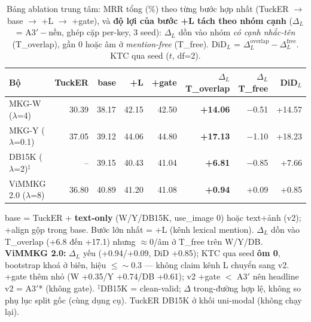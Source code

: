 \begin{table}[t]
\centering
\footnotesize
\setlength{\tabcolsep}{4pt}
\caption{Bảng ablation trung tâm: MRR tổng (\%) theo từng bước hợp nhất (TuckER $\to$ base $\to$ +L $\to$ +gate), và \textbf{độ lợi của bước +L tách theo nhóm cạnh} ($\Delta_L$ = A3$'-$nền, ghép cặp per-key, 3 seed): $\Delta_L$ dồn vào nhóm \emph{có cạnh nhắc-tên} (T\_overlap), gần 0 hoặc âm ở \emph{mention-free} (T\_free). DiD$_L$ = $\Delta_L^{\text{overlap}}-\Delta_L^{\text{free}}$. KTC qua seed ($t$, df=2).}
\label{tab:trung_tam}
\begin{tabular}{l r r r r r r r}
\toprule
Bộ & TuckER & base & +L & +gate & $\Delta_L$ T\_overlap & $\Delta_L$ T\_free & DiD$_L$ \\
\midrule
MKG-W ($\lambda$=4) & 30.39 & 38.17 & 42.15 & 42.50 & \textbf{+14.06} & $-$0.51 & +14.57 \\
MKG-Y ($\lambda$=0.1) & 37.05 & 39.12 & 44.06 & 44.80 & \textbf{+17.13} & $-$1.10 & +18.23 \\
DB15K ($\lambda$=2)$^\ddagger$ & -- & 39.15 & 40.43 & 41.04 & \textbf{+6.81} & $-$0.85 & +7.66 \\
ViMMKG 2.0 ($\lambda$=8) & 36.80 & 40.89 & 41.20 & 41.08 & \textbf{+0.94} & +0.09 & +0.85 \\
\bottomrule
\end{tabular}
\vspace{2pt}
\begin{minipage}{\linewidth}\footnotesize\raggedright
base = TuckER + \textbf{text-only} (W/Y/DB15K, use\_image 0) hoặc text+ảnh (v2); +align gộp trong base. Bước lớn nhất = +L (kênh lexical mention). $\Delta_L$ dồn vào T\_overlap (+6.8 đến +17.1) nhưng $\approx$0/âm ở T\_free trên W/Y/DB. \textbf{ViMMKG 2.0:} $\Delta_L$ yếu (+0.94/+0.09, DiD +0.85); KTC qua seed \textbf{ôm 0}, bootstrap khoá ở biên, hiệu $\le\sim$0.3 --- không claim kênh L chuyển sang v2. +gate thêm nhỏ (W +0.35/Y +0.74/DB +0.61); v2 +gate $<$ A3$'$ nên headline v2 = A3$'$* (không gate). $^\ddagger$DB15K = clean-valid; $\Delta$ trong-đường hợp lệ, không so phụ lục split gốc (cùng dụng cụ). TuckER DB15K ở khối uni-modal (không chạy lại).
\end{minipage}
\end{table}
